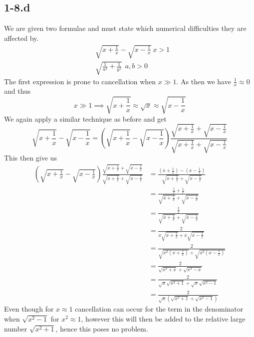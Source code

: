 \documentclass{article}
\begin{document}
\subsection*{1-8.d}
We are given two formulae and must state  which numerical difficulties they are affected by.
\begin{align*}
    &\sqrt{x + \frac{1}{x}} - \sqrt{x - \frac{1}{x}} \: x > 1\\
    &\sqrt{\frac{1}{a^{2}} + \frac{1}{b^{2}}}\: \: a,b > 0
\end{align*}
The first expression is prone to cancellation when  $x \gg 1$. As then we have $\frac{1}{x} \approx 0$ and thus \begin{equation*}
    x \gg 1 \implies \sqrt{x+\frac{1}{x}} \approx \sqrt{x} \approx \sqrt{x - \frac{1}{x}}
\end{equation*}
We again apply a similar technique as before and get
\begin{equation*}
    \sqrt{x + \frac{1}{x}} - \sqrt{x - \frac{1}{x}} = 
    \left(\sqrt{x + \frac{1}{x}} - \sqrt{x - \frac{1}{x}}\right) \frac{ \sqrt{x + \frac{1}{x}} + \sqrt{x - \frac{1}{x}}}{ \sqrt{x + \frac{1}{x}} + \sqrt{x - \frac{1}{x}}}
\end{equation*}
This then give us
\begin{align*}
    \left(\sqrt{x + \frac{1}{x}} - \sqrt{x - \frac{1}{x}}\right) \frac{ \sqrt{x + \frac{1}{x}} + \sqrt{x - \frac{1}{x}}}{ \sqrt{x + \frac{1}{x}} + \sqrt{x - \frac{1}{x}}} &= \frac{\left(x + \frac{1}{x}\right)-\left(x-\frac{1}{x}\right)}{\sqrt{x + \frac{1}{x}} + \sqrt{x - \frac{1}{x}}} \\
    &= \frac{\frac{1}{x}+\frac{1}{x}}{\sqrt{x + \frac{1}{x}} + \sqrt{x - \frac{1}{x}}} \\
    &= \frac{\frac{2}{x}}{\sqrt{x + \frac{1}{x}} + \sqrt{x - \frac{1}{x}}} \\
    &= \frac{2}{x\sqrt{x + \frac{1}{x}} + x\sqrt{x - \frac{1}{x}}} \\
    &= \frac{2}{\sqrt{x^{2}\left(x + \frac{1}{x}\right)} + \sqrt{x^{2}\left(x - \frac{1}{x}\right)}} \\
    &= \frac{2}{\sqrt{x^{3} + x} + \sqrt{x^{3} - x}} \\
    &= \frac{2}{\sqrt{x}\sqrt{x^{2} + 1} + \sqrt{x}\sqrt{x^{2} - 1}} \\
    &= \frac{2}{\sqrt{x}\left(\sqrt{x^{2} + 1} + \sqrt{x^{2} - 1}\right)} 
\end{align*}
Even though for $x \approx 1$ cancellation can occur for the term in the denominator when $\sqrt{x^{2} - 1}$ for $x^{2} \approx 1$, however this will then be added to the relative large number $\sqrt{x^{2}+1}$, hence this poses no problem.
\end{document}
